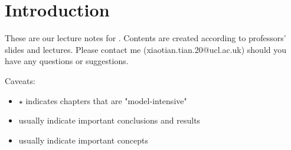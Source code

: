 \chapter*{Introduction}
These are our  lecture notes for . Contents are created according to professors' slides and lectures. Please contact me  (xiaotian.tian.20@ucl.ac.uk) should you have any questions or suggestions.

Caveats:
\begin{itemize}
    \item $\star$ indicates chapters that are "model-intensive"
    \item {} usually indicate important conclusions and results
    \item {} usually indicate important concepts
\end{itemize}

\iffalse
    \begin{figure}[H]
        \centering
        \texttt{[image: images/102115356\_p0.jpg]}
        \caption{Enjoy this lovely picture before we start!}
        \label{fig:Introduction}
    \end{figure}
\fi